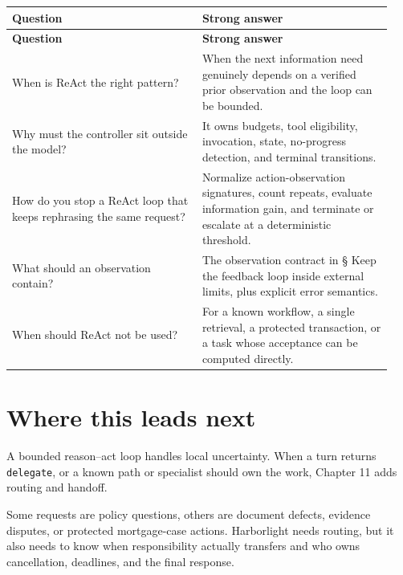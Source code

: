 \BookTableStart
\small
\begin{longtable}{@{}Y{0.4700\linewidth}Y{0.4700\linewidth}@{}}
\color{white}\bfseries \textbf{Question} & \color{white}\bfseries \textbf{Strong answer} \\
\endfirsthead
{}
\color{white}\bfseries \textbf{Question} & \color{white}\bfseries \textbf{Strong answer} \\
\endhead
When is ReAct the right pattern? & When the next information need genuinely depends on a verified prior observation and the loop can be bounded. \\
Why must the controller sit outside the model? & It owns budgets, tool eligibility, invocation, state, no-progress detection, and terminal transitions. \\
How do you stop a ReAct loop that keeps rephrasing the same request? & Normalize action-observation signatures, count repeats, evaluate information gain, and terminate or escalate at a deterministic threshold. \\
What should an observation contain? & The observation contract in § Keep the feedback loop inside external limits, plus explicit error semantics. \\
When should ReAct not be used? & For a known workflow, a single retrieval, a protected transaction, or a task whose acceptance can be computed directly. \\
\end{longtable}
\BookTableEnd

\section{Where this leads next}

A bounded reason–act loop handles local uncertainty. When a turn returns \lstinline[style=bookinline]!delegate!, or a known path or specialist should own the work, Chapter 11 adds routing and handoff.\par



\begin{bookcallout}
Some requests are policy questions, others are document defects, evidence disputes, or protected mortgage-case actions. Harborlight needs routing, but it also needs to know when responsibility actually transfers and who owns cancellation, deadlines, and the final response.
\end{bookcallout}

